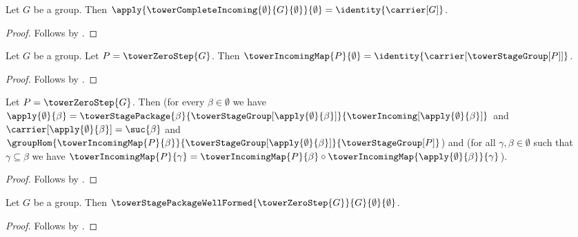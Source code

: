 \begin{proposition}\label{tower_zero_step_identity_raw}
    Let $G$ be a group.
    Then $\apply{
            \towerCompleteIncoming{\emptyset}{G}{\emptyset}}
            {\emptyset}=
        \identity{\carrier[G]}$.
\end{proposition}
\begin{proof}
    Follows by
        .
\end{proof}

\begin{proposition}\label{tower_zero_step_identity}
    Let $G$ be a group.
    Let $P=\towerZeroStep{G}$.
    Then $\towerIncomingMap{P}{\emptyset}=
        \identity{\carrier[\towerStageGroup[P]]}$.
\end{proposition}
\begin{proof}
    Follows by
        .
\end{proof}

\begin{proposition}\label{tower_zero_step_vacuous_laws}
    Let $P=\towerZeroStep{G}$.
    Then (for every $\beta\in\emptyset$ we have
            $\apply{\emptyset}{\beta}=\towerStagePackage{\beta}
                {\towerStageGroup[\apply{\emptyset}{\beta}]}
                {\towerIncoming[\apply{\emptyset}{\beta}]}$ and
            $\carrier[\apply{\emptyset}{\beta}]=\suc{\beta}$ and
            $\groupHom
                {\towerIncomingMap{P}{\beta}}
                {\towerStageGroup[\apply{\emptyset}{\beta}]}
                {\towerStageGroup[P]}$) and
        (for all $\gamma,\beta\in\emptyset$ such that
            $\gamma\subseteq\beta$ we have
            $\towerIncomingMap{P}{\gamma}=
                \towerIncomingMap{P}{\beta}\circ
                    \towerIncomingMap{\apply{\emptyset}{\beta}}{\gamma}$).
\end{proposition}
\begin{proof}
    Follows by .
\end{proof}

\begin{proposition}\label{tower_zero_step_well_formed}
    Let $G$ be a group.
    Then $\towerStagePackageWellFormed
        {\towerZeroStep{G}}{G}{\emptyset}{\emptyset}$.
\end{proposition}
\begin{proof}
    Follows by
        .
\end{proof}

